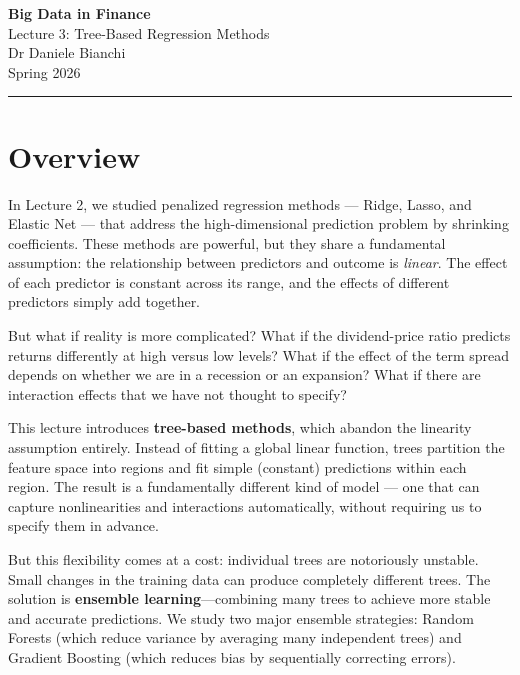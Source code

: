\documentclass[11pt,a4paper]{article}
\newcommand{\keyword}[1]{\textbf{\textcolor{AccentOrange}{#1}}}
\begin{document}
\begin{center}
    {\LARGE\bfseries\textcolor{ThemeBlue}{Big Data in Finance}}\\[0.5em]
    {\Large Lecture 3: Tree-Based Regression Methods}\\[1em]
    {\large Dr Daniele Bianchi}\\[0.5em]
    {\normalsize Spring 2026}
\end{center}

\vspace{1em}
\hrule
\vspace{1em}

\tableofcontents

\vspace{2cm}
\section*{Overview}

In Lecture 2, we studied penalized regression methods — Ridge, Lasso, and Elastic Net — that address the high-dimensional prediction problem by shrinking coefficients. These methods are powerful, but they share a fundamental assumption: the relationship between predictors and outcome is \emph{linear}. The effect of each predictor is constant across its range, and the effects of different predictors simply add together.

But what if reality is more complicated? What if the dividend-price ratio predicts returns differently at high versus low levels? What if the effect of the term spread depends on whether we are in a recession or an expansion? What if there are interaction effects that we have not thought to specify?

This lecture introduces \keyword{tree-based methods}, which abandon the linearity assumption entirely. Instead of fitting a global linear function, trees partition the feature space into regions and fit simple (constant) predictions within each region. The result is a fundamentally different kind of model — one that can capture nonlinearities and interactions automatically, without requiring us to specify them in advance.

But this flexibility comes at a cost: individual trees are notoriously unstable. Small changes in the training data can produce completely different trees. The solution is \keyword{ensemble learning}---combining many trees to achieve more stable and accurate predictions. We study two major ensemble strategies: Random Forests (which reduce variance by averaging many independent trees) and Gradient Boosting (which reduces bias by sequentially correcting errors).
\end{document}
